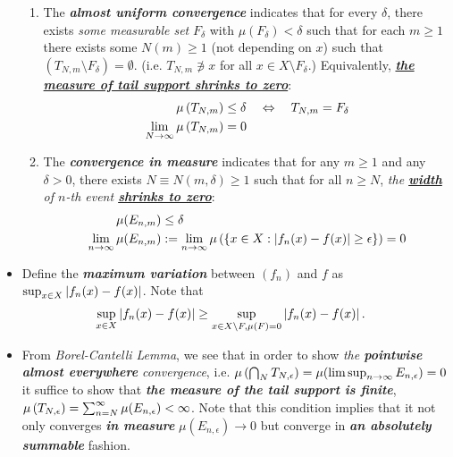 \documentclass[11pt]{article}
\begin{document}
\begin{itemize}
\begin{remark}
\begin{enumerate}
\item The \emph{\textbf{almost uniform convergence}}  indicates that for every $\delta$, there exists \emph{some measurable set} $F_{\delta}$ with $\mu(F_{\delta}) < \delta$ such that  for each $m\ge 1$ there exists some $N(m)\ge 1$ (not depending on $x$) such that $(T_{N,m} \setminus F_{\delta}) = \emptyset$. (i.e. $T_{N,m} \not\ni x$ for all $x \in X \setminus F_{\delta}$.) Equivalently, \emph{\textbf{\underline{the measure of  tail support shrinks to zero}}}:
\begin{align*}
\mu\left(T_{N,m}\right) &\le \delta  \quad \Leftrightarrow \quad T_{N,m} = F_\delta\\
\lim\limits_{N\rightarrow \infty}\mu\left(T_{N,m}\right) &=0
\end{align*} 


\item The \emph{\textbf{convergence in measure}} indicates that for any $m\ge 1$ and any $\delta > 0$, there exists $N \equiv N(m, \delta)\ge 1$ such that for all $n \ge N$, \emph{the \underline{\textbf{width}} of $n$-th event \underline{\textbf{shrinks to zero}}}:
\begin{align*}
\mu(E_{n,m}) &\le \delta \\
 \lim\limits_{n\rightarrow \infty}\mu(E_{n, m}) &:=  \lim\limits_{n\rightarrow \infty}\mu\left(\left\{x \in X: \left\lvert f_n(x) - f(x) \right\rvert \ge \epsilon\right\} \right) =0 
\end{align*} 
\end{enumerate}
\end{remark}

\item \begin{definition}
Define the \emph{\textbf{maximum variation}} between $(f_n)$ and $f$ as $ \sup_{x\in X}\left\lvert f_{n}(x)- f(x) \right\rvert$. Note that 
\begin{align*}
 \sup\limits_{x\in X}\left\lvert f_{n}(x)- f(x) \right\rvert &\ge \sup_{x\in X\setminus F, \mu(F) =0}\left\lvert f_{n}(x)- f(x) \right\rvert.
\end{align*}
\end{definition}

\item \begin{remark}
From \emph{Borel-Cantelli Lemma}, we see that in order to show \emph{the \textbf{pointwise almost everywhere} convergence}, i.e.  $\mu\left(\bigcap_{N}T_{N,\epsilon}\right) =\mu(\limsup_{n \rightarrow \infty}E_{n, \epsilon})= 0$ it suffice to show that \emph{\textbf{the measure of the tail support is finite}}, $\mu\left(T_{N,\epsilon}\right) = \sum_{n=N}^{\infty}\mu(E_{n, \epsilon}) < \infty$. Note that this condition implies that it not only converges \emph{\textbf{in measure}} $\mu(E_{n, \epsilon}) \rightarrow 0$ but converge in \textbf{\emph{an absolutely summable}} fashion.
\end{remark}

\end{itemize}
\end{document}
